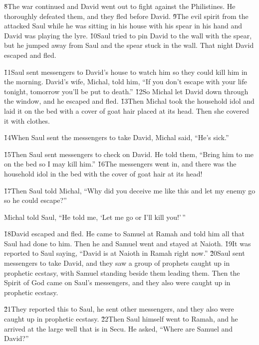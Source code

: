 \v{8}The war continued and David went out to fight against the Philistines. He thoroughly defeated them, and they fled before David. \v{9}The evil spirit from the  attacked Saul while he was sitting in his house with his spear in his hand and David was playing the lyre. \v{10}Saul tried to pin David to the wall with the spear, but he jumped away from Saul and the spear stuck in the wall. That night David escaped and fled.

\v{11}Saul sent messengers to David's house to watch him so they could kill him in the morning. David's wife, Michal, told him, ``If you don't escape with your life tonight, tomorrow you'll be put to death.'' \v{12}So Michal let David down through the window, and he escaped and fled. \v{13}Then Michal took the household idol and laid it on the bed with a cover of goat hair placed at its head. Then she covered it with clothes.

\v{14}When Saul sent the messengers to take David, Michal said, ``He's sick.''

\v{15}Then Saul sent messengers to check on David. He told them, ``Bring him to me on the bed so I may kill him.'' \v{16}The messengers went in, and there was the household idol in the bed with the cover of goat hair at its head!

\v{17}Then Saul told Michal, ``Why did you deceive me like this and let my enemy go so he could escape?''

Michal told Saul, ``He told me, `Let me go or I'll kill you!'\,''

\v{18}David escaped and fled. He came to Samuel at Ramah and told him all that Saul had done to him. Then he and Samuel went and stayed at Naioth. \v{19}It was reported to Saul saying, ``David is at Naioth in Ramah right now.'' \v{20}Saul sent messengers to take David, and they saw a group of prophets caught up in prophetic ecstasy, with Samuel standing beside them leading them. Then the Spirit of God came on Saul's messengers, and they also were caught up in prophetic ecstasy.

\v{21}They reported this to Saul, he sent other messengers, and they also were caught up in prophetic ecstasy. \v{22}Then Saul himself went to Ramah, and he arrived at the large well that is in Secu. He asked, ``Where are Samuel and David?''

